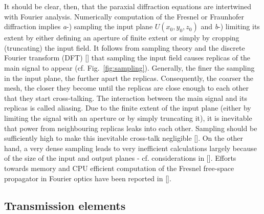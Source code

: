 \begin{refsection}
It should be clear, then, that the paraxial diffraction equations are intertwined with Fourier analysis. Numerically computation of the Fresnel or Fraunhofer diffraction implies \textit{a}-) sampling the input plane $U(x_0,y_0,z_0)$ and \textit{b}-) limiting its extent by either defining an aperture of finite extent or simply by cropping (truncating) the input field. It follows from sampling theory and the discrete Fourier transform (DFT) [\cite[\textit{§10}~\&~\textit{§11}]{Bracewell2000}] that sampling the input field causes replicas of the main signal to appear (cf. Fig.~\ref{fig:sampling}). Generally, the finer the sampling in the input plane, the further apart the replicas. Consequently, the coarser the mesh, the closer they become until the replicas are close enough to each other that they start cross-talking. The interaction between the main signal and its replicas is called aliasing. Due to the finite extent of the input plane (either by limiting the signal with an aperture or by simply truncating it), it is inevitable that power from neighbouring replicas leaks into each other. Sampling should be sufficiently high to make this inevitable cross-talk negligible [\cite{Kelly2014}]. On the other hand, a very dense sampling leads to very inefficient calculations largely because of the size of the input and output planes - cf. considerations in [\cite[\textit{§5}]{Goodman2015}]. Efforts towards memory and CPU efficient computation of the Fresnel free-space propagator in Fourier optics have been reported in [\cite{Chubar2019}].

\subsection{Transmission elements}\label{sec:thin_element}


\end{refsection}
